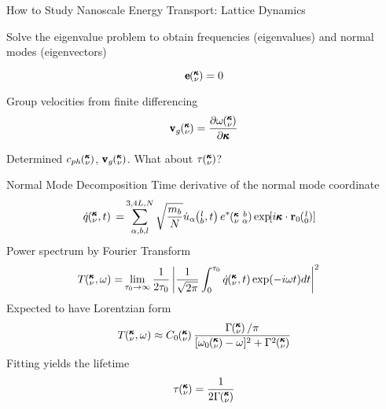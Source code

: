 \documentclass{beamer}
\newcommand{\EXP}[1]{\exp\mspace{-5.0mu}\left[#1\right]\mspace{-3.0mu}}
\newcommand{\lO}{\mspace{-4.0mu}\left(\mspace{-8.0mu}
\begin{smallmatrix}&l \\&0\end{smallmatrix}
\mspace{-3.0mu}\right)}
\newcommand{\kvba}{\mspace{-4.0mu}\left(\mspace{-8.0mu}
\begin{smallmatrix} &\pmb{\kappa} &b \\ &\nu &\alpha\end{smallmatrix}
\mspace{-3.0mu}\right)}
\newcommand{\kvt}{\mspace{-4.0mu}\left(\mspace{-8.0mu}
\begin{smallmatrix}&\pmb{\kappa} \\&\nu\end{smallmatrix}
\mspace{-2.0mu},t\right)}
\newcommand{\kvw}{\mspace{-4.0mu}\left(\mspace{-8.0mu}
\begin{smallmatrix}&\pmb{\kappa} \\&\nu\end{smallmatrix}
\mspace{-2.0mu},\omega\right)}
\newcommand{\kv}{\mspace{-4.0mu}\left(\mspace{-8.0mu}
\begin{smallmatrix}&\pmb{\kappa} \\&\nu\end{smallmatrix}
\mspace{-3.0mu}\right)}
\newcommand{\lbt}{\mspace{-4.0mu}\left(\mspace{-8.0mu}
\begin{smallmatrix}&l \\&b\end{smallmatrix}\mspace{-2.0mu},t\right)}
\begin{document}
\begin{frame}{How to Study Nanoscale Energy Transport: Lattice Dynamics}

Solve the eigenvalue problem to obtain frequencies (eigenvalues) and normal modes (eigenvectors)

\begin{equation}
[D(\pmb{\kappa})-I\omega^2\kv]\pmb{\mathrm{e}}\kv = 0
\end{equation}

Group velocities from finite differencing
\begin{equation}\label{EQ:NMD:vg}
\begin{split}
\pmb{\mathrm{v}}_{g}\kv=\frac{\partial \omega \kv}{\partial \pmb{\kappa}}
\end{split}
\end{equation}

Determined $c_{ph}\kv$, $\pmb{\mathrm{v}}_{g}\kv$. What about $\tau \kv$?

\end{frame}



\begin{frame}{Normal Mode Decomposition}
Time derivative of the normal mode coordinate
\begin{equation}\label{EQ:NMD:qdot}
\begin{split}
\dot{q}\kvt{}{}{}=&\sum_{\alpha, b, l}^{3,4L,N}\sqrt{\frac{m_b}{N}}\dot{u}_{\alpha}\lbt e^*\kvba\EXP{i\pmb{\kappa}\cdot\mathbf{r}_0\lO}
\end{split}
\end{equation}
Power spectrum by Fourier Transform
\begin{equation}\label{EQ:NMD:SED}
\begin{split}
T\kvw=&\lim_{\tau_0\rightarrow\infty}\frac{1}{2\tau_0}\left|\frac{1}{\sqrt{2\pi}}\int_{0}^{\tau_0}\dot{q}\kvt\exp(-i\omega t)dt\right|^2
\end{split}
\end{equation}
Expected to have Lorentzian form
\begin{equation}\label{EQ:NMD:LOR}
T\kvw \approx C_0\kv\frac{\Gamma\kv/\pi}{[\omega_0\kv-\omega]^2+\Gamma^2\kv}
\end{equation}
Fitting yields the lifetime
\begin{equation}\label{EQ:lifetime}
\tau\kv=\frac{1}{2\Gamma\kv}
\end{equation}

\end{frame}
\end{document}
